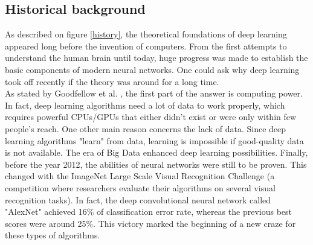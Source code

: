 \subsection{Historical background}
\label{historical_background}

\setlength{\marginparwidth}{3cm}\leavevmode {}As described on figure \ref{history}, the theoretical foundations of deep learning appeared long before the invention of computers. From the first attempts to understand the human brain until today, huge progress was made to establish the basic components of modern neural networks. One could ask why deep learning took off recently if the theory was around for a long time.\\
As stated by Goodfellow et al. \cite{15}, the first part of the answer is computing power. In fact, deep learning algorithms need a lot of data to work properly, which requires powerful CPUs/GPUs that either didn't exist or were only within few people's reach. One other main reason concerns the lack of data. Since deep learning algorithms "learn" from data, learning is impossible if good-quality data is not available. The era of Big Data enhanced deep learning possibilities. 
Finally, before the year 2012, the abilities of neural networks were still to be proven. This changed with the ImageNet Large Scale Visual Recognition Challenge (a competition where researchers evaluate their algorithms on several visual recognition tasks). In fact, the deep convolutional neural network called "AlexNet" achieved 16\% of classification error rate, whereas the previous best scores were around 25\%. This victory marked the beginning of a new craze for these types of algorithms.


